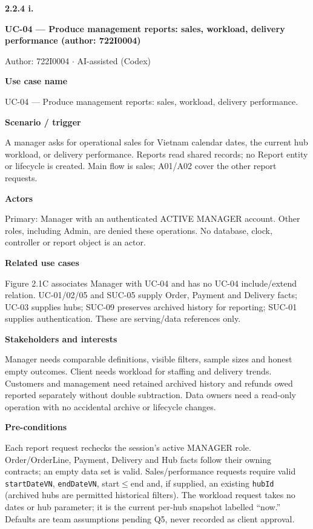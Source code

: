 \textbf{2.2.4 i.}\par
\textbf{UC-04 --- Produce management reports: sales, workload, delivery performance (author: 722I0004)}

Author: 722I0004 \ensuremath{\cdot} AI-assisted (Codex)

\textbf{Use case name}

UC-04 --- Produce management reports: sales, workload, delivery performance.

\textbf{Scenario / trigger}

A manager asks for operational sales for Vietnam calendar dates, the current hub workload, or delivery performance. Reports read shared records; no Report entity or lifecycle is created. Main flow is sales; A01/A02 cover the other report requests.

\textbf{Actors}

Primary: Manager with an authenticated ACTIVE MANAGER account. Other roles, including Admin, are denied these operations. No database, clock, controller or report object is an actor.

\textbf{Related use cases}

Figure 2.1C associates Manager with UC-04 and has no UC-04 include/extend relation. UC-01/02/05 and SUC-05 supply Order, Payment and Delivery facts; UC-03 supplies hubs; SUC-09 preserves archived history for reporting; SUC-01 supplies authentication. These are serving/data references only.

\textbf{Stakeholders and interests}

Manager needs comparable definitions, visible filters, sample sizes and honest empty outcomes. Client needs workload for staffing and delivery trends. Customers and management need retained archived history and refunds owed reported separately without double subtraction. Data owners need a read-only operation with no accidental archive or lifecycle changes.

\textbf{Pre-conditions}

Each report request rechecks the session's active MANAGER role. Order/OrderLine, Payment, Delivery and Hub facts follow their owning contracts; an empty data set is valid. Sales/performance requests require valid \texttt{startDateVN}, \texttt{endDateVN}, start\ensuremath{\leq}end and, if supplied, an existing \texttt{hubId} (archived hubs are permitted historical filters). The workload request takes no dates or hub parameter; it is the current per-hub snapshot labelled ``now.'' Defaults are team assumptions pending Q5, never recorded as client approval.

